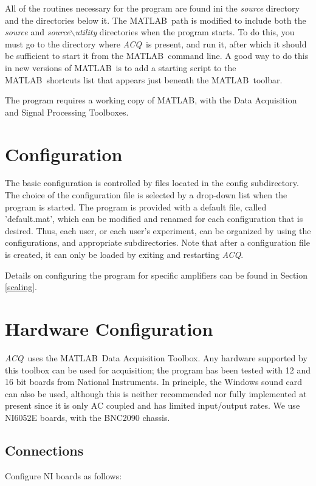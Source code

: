 \documentclass[11pt, letterpaper, titlepage]{paper}
\newcommand{\acq}{\textsl{ACQ}}
\newcommand{\ml}{\textsf{MATLAB}}
\begin{document}
All of the routines necessary for the program are 
found ini the \textsl{source} directory and the directories below 
it.  The \ml\ path is modified to include both the 
\textsl{source} and \textsl{source$\backslash$utility} 
directories when the program starts. To do this, you must go to the directory where 
\acq\ is present, and run it, after which it should be sufficient 
to start it from the \ml\ command line. A good way to do this in new versions of \ml\ is to 
add a starting script to the \ml\ shortcuts list that appears just beneath the \ml\ toolbar.

The program requires a working copy of \ml, with the Data 
Acquisition and Signal Processing Toolboxes.

\section{Configuration}
The basic configuration is controlled by files located in the config subdirectory. The choice of the 
configuration file is selected by a drop-down list when the 
program is started. The program is provided with a default file, 
called 'default.mat', which can be modified and renamed for each 
configuration that is desired. Thus, each user, or each user's 
experiment, can be organized by using the configurations, and 
appropriate subdirectories. Note that after a configuration file is created, it can only be loaded by 
exiting and restarting \acq. 


Details on configuring the program for specific amplifiers can be 
found in Section \ref{scaling}.

\section{Hardware Configuration}
\acq\ uses the \ml\ Data Acquisition Toolbox. Any hardware 
supported by this toolbox can be used for acquisition; the program 
has been tested with 12 and 16 bit boards from National 
Instruments. In principle, the Windows sound card can also be 
used, although this is neither recommended nor fully implemented at present since it is only 
AC coupled and has limited input/output rates. We use NI6052E boards, with the BNC2090 chassis. 

\subsection{Connections}
Configure NI boards as follows:
\end{document}

